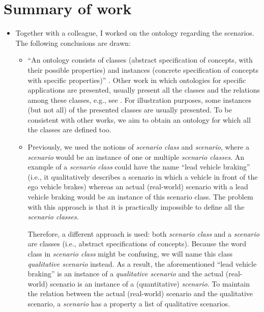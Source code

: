 \documentclass[10pt,final,a4paper,oneside,onecolumn]{article}
\begin{document}
\section{Summary of work}

\begin{itemize}
	\item Together with a colleague, I worked on the ontology regarding the scenarios. The following conclusions are drawn:
	\begin{itemize}
		\item ``An ontology consists of classes (abstract specification of concepts, with their possible properties) and instances (concrete specification of concepts with specific properties)'' \cite{vanDamPhDThesis2009}. Other work in which ontologies for specific applications are presented, usually present all the classes and the relations among these classes, e.g., see \cite{jones2011international, gkoutos2004mouse, kim2005security, chen2003ontology, golemati2007creating, lee2017location, matsokis2010plm, vanDamPhDThesis2009}. For illustration purposes, some instances (but not all) of the presented classes are usually presented. To be consistent with other works, we aim to obtain an ontology for which all the classes are defined too.
		
		\item Previously, we used the notions of \emph{scenario class} and \emph{scenario}, where a \emph{scenario} would be an instance of one or multiple \emph{scenario classes}. An example of a \emph{scenario class} could have the name ``lead vehicle braking'' (i.e., it qualitatively describes a scenario in which a vehicle in front of the ego vehicle brakes) whereas an actual (real-world) scenario with a lead vehicle braking would be an instance of this scenario class. The problem with this approach is that it is practically impossible to define all the \emph{scenario classes}.
		
		Therefore, a different approach is used: both \emph{scenario class} and a \emph{scenario} are classes (i.e., abstract specifications of concepts). Because the word class in \emph{scenario class} might be confusing, we will name this class \emph{qualitative scenario} instead. As a result, the aforementioned ``lead vehicle braking'' is an instance of a \emph{qualitative scenario} and the actual (real-world) scenario is an instance of a (quantitative) \emph{scenario}. To maintain the relation between the actual (real-world) scenario and the qualitative scenario, a \emph{scenario} has a property a list of qualitative scenarios.
		

\end{itemize}
\end{itemize}
\end{document}
